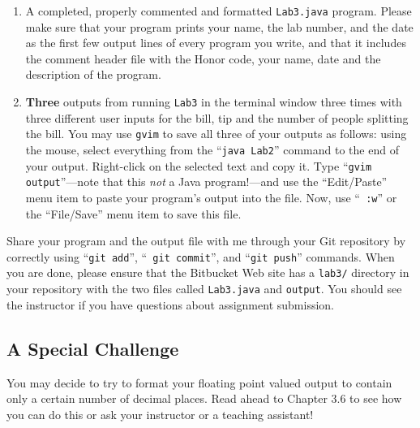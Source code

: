 \begin{enumerate}

	\item A completed, properly commented and formatted {\tt Lab3.java} program. Please make sure that your program prints your name, the lab number, and the date
as the first few output lines of every program you write, and that it includes the comment header file with the Honor code, your name, date and the description of the program.

        \item \textbf{Three} outputs from running {\tt Lab3} in the terminal window three times with three different user inputs for the bill, tip and the number of people splitting the bill. You may use {\tt gvim} to save all three of your outputs as
          follows: using the mouse, select everything from the ``{\tt java Lab2}'' command to the end of your output.
          Right-click on the selected text and copy it.  Type ``{\tt gvim output}''---note that this {\em not} a Java
          program!---and use the ``Edit/Paste'' menu item to paste your program's output into the file.  Now, use ``{\tt
          :w}'' or the ``File/Save'' menu item to save this file.

\end{enumerate}
\vspace{-0.1in}
Share your program and the output file with me through your Git repository by correctly using ``{\tt git add}'', ``{\tt
git commit}'', and ``{\tt git push}'' commands. When you are done, please ensure that the Bitbucket Web site has
a {\tt lab3/} directory in your repository with the two files called {\tt Lab3.java} and {\tt output}. You should see 
the instructor if you have questions about assignment submission.

\vspace{-0.1in}
\subsection*{A Special Challenge}
You may decide to try to format your floating point valued output to contain only a certain number of decimal places. Read ahead to Chapter 3.6 to see how you can do this or ask your instructor or a teaching assistant!


